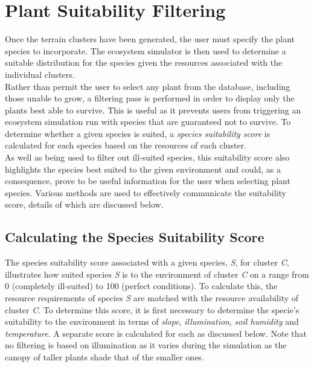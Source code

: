 \section{Plant Suitability Filtering} \label{sec:plant_suitability_filtering}

Once the terrain clusters have been generated, the user must specify the plant species to incorporate. The ecosystem simulator is then used to determine a suitable distribution for the species given the resources associated with the individual clusters.\\

Rather than permit the user to select any plant from the database, including those unable to grow, a filtering pass is performed in order to display only the plants best able to survive. This is useful as it prevents users from triggering an ecosystem simulation run with species that are guaranteed not to survive. To determine whether a given species is suited, a \textit{species suitability score} is calculated for each species based on the resources of each cluster. \\

As well as being used to filter out ill-suited species, this suitability score also highlights the species best suited to the given environment and could, as a consequence, prove to be useful information for the user when selecting plant species. Various methods are used to effectively communicate the suitability score, details of which are discussed below.

\subsection{Calculating the Species Suitability Score}

The species suitability score associated with a given species, \textit{S}, for cluster \textit{C}, illustrates how suited species \textit{S} is to the environment of cluster \textit{C} on a range from 0 (completely ill-suited) to 100 (perfect conditions). To calculate this, the resource requirements of species \textit{S} are matched with the resource availability of cluster \textit{C}. To determine this score, it is first necessary to determine the specie's suitability to the environment in terms of \textit{slope}, \textit{illumination}, \textit{soil humidity} and \textit{temperature}. A separate score is calculated for each as discussed below. Note that no filtering is based on illumination as it varies during the simulation as the canopy of taller plants shade that of the smaller ones.\\

